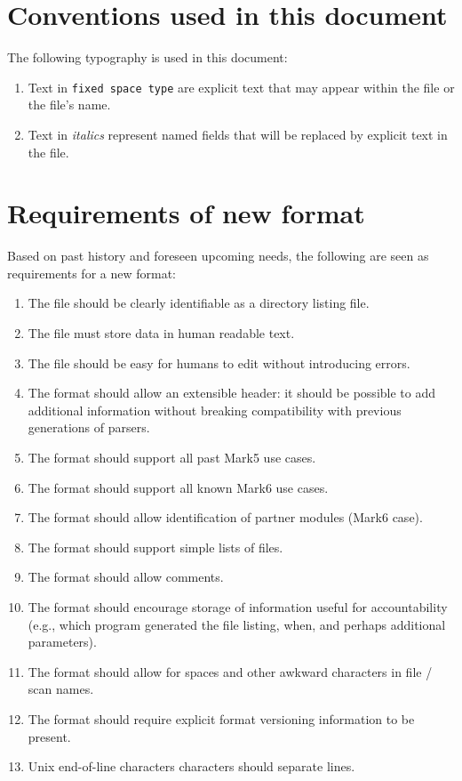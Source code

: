 \documentclass[12pt]{article}
\begin{document}
\section{Conventions used in this document}

The following typography is used in this document:
\begin{enumerate}
\item Text in {\tt fixed space type} are explicit text that may appear within the file or the file's name.
\item Text in {\em italics} represent named fields that will be replaced by explicit text in the file.
\end{enumerate}

\section{Requirements of new format}

Based on past history and foreseen upcoming needs, the following are seen as requirements for a new format:
\begin{enumerate}
\item The file should be clearly identifiable as a directory listing file.
\item The file must store data in human readable text.
\item The file should be easy for humans to edit without introducing errors.
\item The format should allow an extensible header: it should be possible to add additional information without breaking compatibility with previous generations of parsers.
\item The format should support all past Mark5 use cases.
\item The format should support all known Mark6 use cases.
\item The format should allow identification of partner modules (Mark6 case).
\item The format should support simple lists of files.
\item The format should allow comments.
\item The format should encourage storage of information useful for accountability (e.g., which program generated the file listing, when, and perhaps additional parameters).
\item The format should allow for spaces and other awkward characters in file / scan names.
\item The format should require explicit format versioning information to be present.
\item Unix end-of-line characters characters should separate lines.
\end{enumerate}
\end{document}
